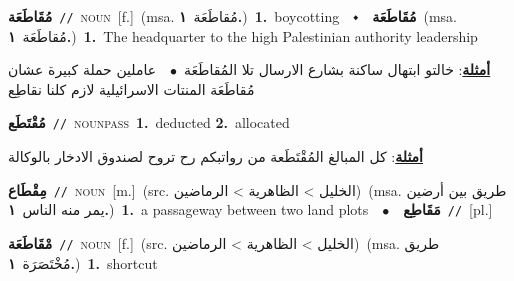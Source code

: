 \documentclass[10pt,a4paper,twoside]{article} %
\begin{document}
\begin{multicols}{2}
{\setlength\topsep{0pt}\textbf{\foreignlanguage{arabic}{مُقَاطَعَة}}\ {\color{gray}\texttt{//}\color{black}}\ \textsc{noun}\ [f.]\ \color{gray}(msa. \foreignlanguage{arabic}{مُقاطَعَة}~\foreignlanguage{arabic}{\textbf{١.}})\color{black}\ \textbf{1.}~boycotting\ \ $\smblkdiamond$\ \ \setlength\topsep{0pt}\textbf{\foreignlanguage{arabic}{مُقَاطَعَة}}\ \color{gray}(msa. \foreignlanguage{arabic}{مُقاطَعَة}~\foreignlanguage{arabic}{\textbf{١.}})\color{black}\ \textbf{1.}~The headquarter to the high Palestinian authority leadership\  \begin{flushright}\color{gray}\foreignlanguage{arabic}{\textbf{\underline{\foreignlanguage{arabic}{أمثلة}}}: خالتو ابتهال ساكنة بشارع الارسال تلا المُقاطَعَة\ $\bullet$\ \  عاملين حملة كبيرة عشان مُقاطَعَة المنتات الاسرائيلية لازم كلنا نقاطِع}\end{flushright}\color{black}} \vspace{2mm}

{\setlength\topsep{0pt}\textbf{\foreignlanguage{arabic}{مُقْتَطَع}}\ {\color{gray}\texttt{//}\color{black}}\ \textsc{noun\textunderscore pass}\ \textbf{1.}~deducted  \textbf{2.}~allocated\  \begin{flushright}\color{gray}\foreignlanguage{arabic}{\textbf{\underline{\foreignlanguage{arabic}{أمثلة}}}: كل المبالغ المُقْتَطَعة من رواتبكم رح تروح لصندوق الادخار بالوكالة}\end{flushright}\color{black}} \vspace{2mm}

{\setlength\topsep{0pt}\textbf{\foreignlanguage{arabic}{مِقْطَاع}}\ {\color{gray}\texttt{//}\color{black}}\ \textsc{noun}\ [m.]\ (src. \color{gray}\foreignlanguage{arabic}{الخليل > الظاهرية > الرماضين}\color{black})\ \color{gray}(msa. \foreignlanguage{arabic}{طريق بين أرضين يمر منه الناس}~\foreignlanguage{arabic}{\textbf{١.}})\color{black}\ \textbf{1.}~a passageway between two land plots\ \ $\bullet$\ \ \setlength\topsep{0pt}\textbf{\foreignlanguage{arabic}{مَقَاطِع}}\ {\color{gray}\texttt{//}\color{black}}\ [pl.]\ } \vspace{2mm}

{\setlength\topsep{0pt}\textbf{\foreignlanguage{arabic}{مْقَاطَعَة}}\ {\color{gray}\texttt{//}\color{black}}\ \textsc{noun}\ [f.]\ (src. \color{gray}\foreignlanguage{arabic}{الخليل > الظاهرية > الرماضين}\color{black})\ \color{gray}(msa. \foreignlanguage{arabic}{طريق مُخْتَصَرَة}~\foreignlanguage{arabic}{\textbf{١.}})\color{black}\ \textbf{1.}~shortcut\ } \vspace{2mm}


\end{multicols}
\end{document}
